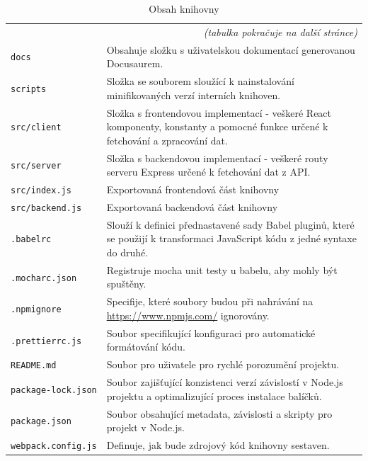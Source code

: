 \documentclass[czech, bc, kiv, he, iso690numb]{fasthesis}
\begin{document}
\begin{center}
	\begin{longtable}{p{}p{}}
	\caption{Obsah knihovny}
	\label{tab:dirLibrary}\\
	\toprule[1.5pt]
	\endhead
	\midrule
	\multicolumn{2}{r}{\textit{(tabulka pokračuje na další stránce)}}\\
	\endfoot
	\bottomrule[1.5pt]
	\endlastfoot
	\verb"docs" & Obsahuje složku s uživatelskou dokumentací generovanou Docusaurem. \\
	\midrule
	\verb"scripts" & Složka se souborem sloužící k nainstalování minifikovaných verzí interních knihoven. \\
	\midrule
	\verb"src/client" & Složka s frontendovou implementací - veškeré React komponenty, konstanty a pomocné funkce určené k fetchování a zpracování dat.  \\
	\midrule
	\verb"src/server" & Složka s backendovou implementací - veškeré routy serveru Express určené k fetchování dat z API.  \\
	\midrule
	\verb"src/index.js" & Exportovaná frontendová část knihovny \\
	\midrule
	\verb"src/backend.js" & Exportovaná backendová část knihovny \\
	\midrule
	\verb".babelrc" & Slouží k definici přednastavené sady Babel pluginů, které se použijí k transformaci JavaScript kódu z jedné syntaxe do druhé.  \\
	\midrule
	\verb".mocharc.json" & Registruje mocha unit testy u babelu, aby mohly být spuštěny.  \\
	\midrule
	\verb".npmignore" & Specifije, které soubory budou při nahrávání na \url{https://www.npmjs.com/} ignorovány. \\
	\midrule
	\verb".prettierrc.js" & Soubor specifikující konfiguraci pro automatické formátování kódu. \\
	\midrule
	\verb"README.md" & Soubor pro uživatele pro rychlé porozumění projektu.  \\
	\midrule
	\verb"package-lock.json" & Soubor zajišťující konzistenci verzí závislostí v Node.js projektu a optimalizující proces instalace balíčků.  \\
	\midrule
	\verb"package.json" & Soubor obsahující metadata, závislosti a skripty pro projekt v Node.js. \\
	\midrule
	\verb"webpack.config.js" & Definuje, jak bude zdrojový kód knihovny sestaven.  \\
	\end{longtable}
\end{center}
\end{document}
